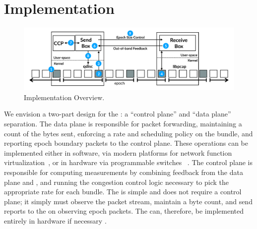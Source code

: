 \section{Implementation}\label{s:impl}
\begin{figure}
    \centering
    \includegraphics[width=2\columnwidth]{img/bundler-diagram}
    \caption{\name Implementation Overview.}\label{fig:bundler}
\end{figure}

We envision a two-part design for the \inbox: a ``control plane'' and ``data plane'' separation.
The data plane is responsible for packet forwarding, maintaining a count of the  bytes sent, enforcing a rate and scheduling policy on the bundle, and reporting epoch boundary packets to the control plane.
These operations can be implemented either in software, via modern platforms for network function virtualization~\cite{bess, click, mos, netbricks}, or in hardware via programmable switches~\cite{p4} .
The control plane is responsible for computing measurements by combining feedback from the data plane and \outbox, and running the congestion control logic necessary to pick the appropriate rate for each bundle.
The \outbox is simple and does not require a control plane; it simply must observe the packet stream, maintain a byte count, and send reports to the \inbox on observing epoch packets.
The \outbox can, therefore, be implemented entirely in hardware if necessary .

